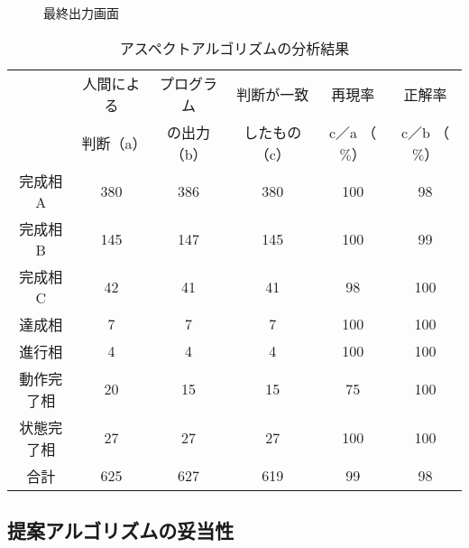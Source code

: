 \begin{figure}[htbp]
 \begin{center}
 \caption{最終出力画面}\label{lastoutput}
 \end{center}
\end{figure}

\begin{table}
 \begin{center}
     \caption{アスペクトアルゴリズムの分析結果}\label{bunseki}
     \begin{tabular}{|c|c|c|c|c|c|} \hline
      & 人間による & プログラム & 判断が一致   & 再現率 & 正解率\\
      & 判断（a）  & の出力（b）& したもの（c）& c／a （$\%$）& c／b （$\%$）\\ \hline\hline
完成相A & 380        & 386        & 380          & 100  & 98 \\ \hline
完成相B & 145        & 147        & 145          & 100  & 99 \\ \hline
完成相C & 42         & 41         & 41           & 98   & 100\\ \hline
達成相  & 7          & 7          & 7            & 100  & 100\\ \hline
進行相  & 4          & 4          & 4            & 100  & 100\\ \hline
動作完了相&20        & 15         & 15           & 75  & 100 \\ \hline
状態完了相&27        & 27         & 27           & 100   & 100\\ \hline
合計      &  625     & 627        & 619          & 99    & 98 \\ \hline
     \end{tabular} 
 \end{center}
\end{table} 


\subsection{提案アルゴリズムの妥当性}

